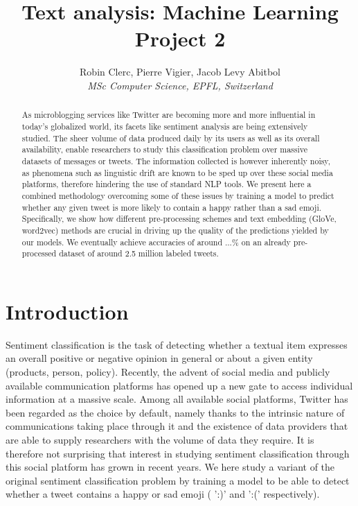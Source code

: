\documentclass[10pt,conference,compsocconf]{IEEEtran}
\begin{document}
\title{Text analysis: Machine Learning Project 2}

\author{
  Robin Clerc, Pierre Vigier, Jacob Levy Abitbol\\
  \textit{MSc  Computer Science, EPFL, Switzerland}
}

\maketitle

\begin{abstract}
As microblogging services like Twitter are becoming
more and more influential in today’s globalized world, its facets
like sentiment analysis are being extensively studied. The sheer volume of data produced daily by its users as well as its overall availability, enable researchers to study this classification problem over massive datasets of messages or tweets. The information collected is however inherently noisy, as phenomena such as linguistic drift are known to be sped up over these social media platforms, therefore hindering the use of standard NLP tools. We present here a combined methodology overcoming some of these issues by training a model to predict whether any given tweet is more likely to contain a happy rather than a sad emoji. Specifically, we show how different pre-processing schemes and text embedding (GloVe, word2vec) methods are crucial in driving up the quality of the  predictions yielded by our models. We eventually achieve accuracies of around ...\% on an already pre-processed dataset of around 2.5 million labeled tweets. 
\end{abstract}








\section{Introduction}
Sentiment classification is the task of detecting whether a textual item expresses an overall positive or negative opinion in general or about a given entity (products, person, policy).
Recently, the advent of social media and publicly available communication platforms has opened up a new gate to access individual information at a massive scale. Among all available social platforms, Twitter has been regarded as the choice by default, namely thanks to the intrinsic nature of communications taking place through it and the existence of data providers that are able to supply researchers with the volume of data they require. It is therefore not surprising that interest in studying sentiment classification through this social platform has grown in recent years. We here study a variant of the original sentiment classification problem by training a model to be able to detect whether a tweet contains  a  happy or sad emoji ( ':)' and  ':('   respectively).
\end{document}
